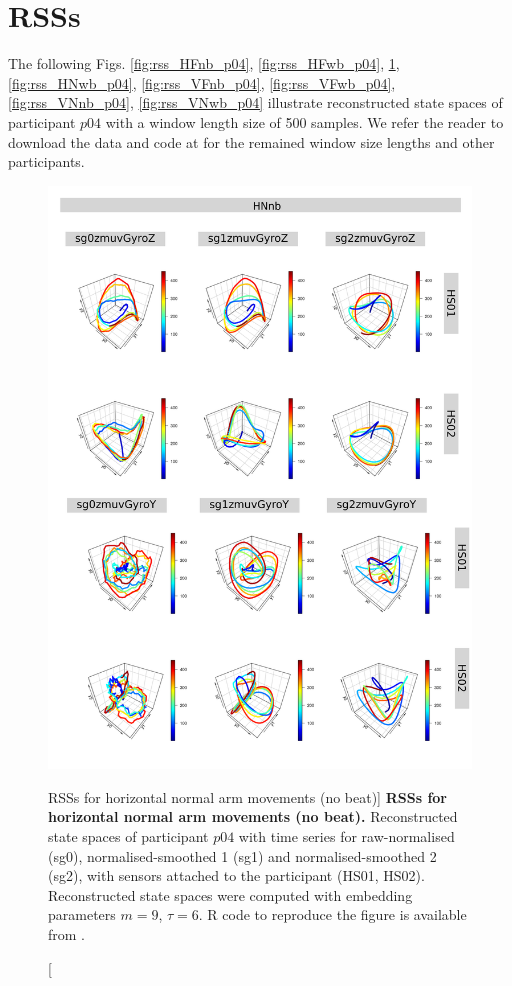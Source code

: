 \newpage
\section{RSSs} \label{appendix:d:rsss}

The following Figs.  
\ref{fig:rss_HFnb_p04},
\ref{fig:rss_HFwb_p04},
\ref{fig:rss_HNnb_p04},
\ref{fig:rss_HNwb_p04},
\ref{fig:rss_VFnb_p04},
\ref{fig:rss_VFwb_p04},
\ref{fig:rss_VNnb_p04},
\ref{fig:rss_VNwb_p04} 
illustrate reconstructed state spaces 
of participant $p04$ with a window length size of 500 samples.
We refer the reader to download the data and code at \cite{hwum2018}
for the remained window size lengths and other participants.




\begin{figure}
\centering
\includegraphics[height=0.8\textheight]{rss_HNnb_p04}
\caption
	[RSSs for horizontal normal arm movements (no beat)]{
	{\bf RSSs for horizontal normal arm movements (no beat).}
	Reconstructed state spaces of participant $p04$
	with time series for raw-normalised (sg0), 
	normalised-smoothed 1 (sg1) and 
	normalised-smoothed 2 (sg2), 
	with sensors attached to the participant (HS01, HS02).
	Reconstructed state spaces were computed with 
	embedding parameters $m=9$, $\tau=6$.
	R code to reproduce the figure is available from \cite{hwum2018}.
        }
     \label{fig:rss_HNnb_p04}
\end{figure}
